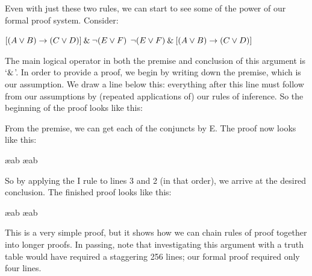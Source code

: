 Even with just these two rules, we can start to see some of the power of our formal proof system. Consider:
\begin{earg}
\prem $[(A\vee B)\rightarrow(C\vee D)] \mathbin{\&} \neg(E\vee F)$
\conc $\neg(E\vee F) \mathbin{\&} [(A\vee B)\rightarrow(C\vee D)]$
\end{earg}
The main logical operator in both the premise and conclusion of this argument is `$\mathbin{\&}$'. In order to provide a proof, we begin by writing down the premise, which is our assumption. We draw a line below this: everything after this line must follow from our assumptions by (repeated applications of) our rules of inference. So the beginning of the proof looks like this:
\begin{pf}
\end{pf}
From the premise, we can get each of the conjuncts by {\eand}E. The proof now looks like this:
\begin{pf}
	 \ae{ab}
	 \ae{ab}
\end{pf}
So by applying the {\eand}I rule to lines 3 and 2 (in that order), we arrive at the desired conclusion. The finished proof looks like this:
\begin{pf}

	 \ae{ab}
	 \ae{ab}
	 
\end{pf}
This is a very simple proof, but it shows how we can chain rules of proof together into longer proofs. In passing, note that investigating this argument with a truth table would have required a staggering 256 lines; our formal proof required only four lines. 

